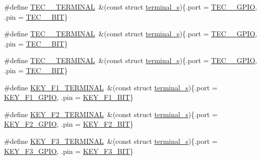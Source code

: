 \begin{DoxyCompactItemize}
\item 
\#define \hyperlink{group__hal_gaf57c15d1a0c66122305352e3637026c2}{T\+E\+C\+\_\+\_\+\+T\+E\+R\+M\+I\+N\+AL}~\&(const struct \hyperlink{structterminal__s}{terminal\+\_\+s})\{.port = \hyperlink{group__samples_ga83ce1f0ab51ee7b4df55e629cdfc52d9}{T\+E\+C\+\_\+\_\+\+G\+P\+IO}, .pin = \hyperlink{group__samples_gaed7549a304721e36693036c8a289ff4c}{T\+E\+C\+\_\+\_\+\+B\+IT}\}
\item 
\#define \hyperlink{group__hal_ga9f8f74ae7816a025d02645ae892d1126}{T\+E\+C\+\_\+\_\+\+T\+E\+R\+M\+I\+N\+AL}~\&(const struct \hyperlink{structterminal__s}{terminal\+\_\+s})\{.port = \hyperlink{group__samples_gae8728c8f2e4279383925ff93a183b407}{T\+E\+C\+\_\+\_\+\+G\+P\+IO}, .pin = \hyperlink{group__samples_ga64392cf03fba776f8a9dc238e25ec184}{T\+E\+C\+\_\+\_\+\+B\+IT}\}
\item 
\#define \hyperlink{group__hal_gabc104deb091e5ee6be6445dbd2c5d1ae}{T\+E\+C\+\_\+\_\+\+T\+E\+R\+M\+I\+N\+AL}~\&(const struct \hyperlink{structterminal__s}{terminal\+\_\+s})\{.port = \hyperlink{group__samples_gaa5418f15596d7ada110c4105aa70e561}{T\+E\+C\+\_\+\_\+\+G\+P\+IO}, .pin = \hyperlink{group__samples_gac7c8a49f0602d0aeee33923ce8708a4b}{T\+E\+C\+\_\+\_\+\+B\+IT}\}
\item 
\#define \hyperlink{group__hal_ga5626e4124830d632401a45cef41ab012}{K\+E\+Y\+\_\+\+F1\+\_\+\+T\+E\+R\+M\+I\+N\+AL}~\&(const struct \hyperlink{structterminal__s}{terminal\+\_\+s})\{.port = \hyperlink{group__hal_ga5ca4d37214720b82e845407c6fa2347a}{K\+E\+Y\+\_\+\+F1\+\_\+\+G\+P\+IO}, .pin = \hyperlink{group__hal_gaa5e208d84a752a40a307c23236dc60e2}{K\+E\+Y\+\_\+\+F1\+\_\+\+B\+IT}\}
\item 
\#define \hyperlink{group__hal_ga7ff86388200bb3989273fc3b0dc138b2}{K\+E\+Y\+\_\+\+F2\+\_\+\+T\+E\+R\+M\+I\+N\+AL}~\&(const struct \hyperlink{structterminal__s}{terminal\+\_\+s})\{.port = \hyperlink{group__hal_ga84995a20a536edfbc062b220c761768e}{K\+E\+Y\+\_\+\+F2\+\_\+\+G\+P\+IO}, .pin = \hyperlink{group__hal_gaa1529bc5c7a8cc9c0221078f2425eed8}{K\+E\+Y\+\_\+\+F2\+\_\+\+B\+IT}\}
\item 
\#define \hyperlink{group__hal_ga407d2cd21ce7ba2bca291fa83db88c6e}{K\+E\+Y\+\_\+\+F3\+\_\+\+T\+E\+R\+M\+I\+N\+AL}~\&(const struct \hyperlink{structterminal__s}{terminal\+\_\+s})\{.port = \hyperlink{group__hal_gac7de7a3e791e70cb61e1ba74c23fd8f3}{K\+E\+Y\+\_\+\+F3\+\_\+\+G\+P\+IO}, .pin = \hyperlink{group__hal_ga0b750ff71397168903bb9406b4a0bc43}{K\+E\+Y\+\_\+\+F3\+\_\+\+B\+IT}\}
\item 

\end{DoxyCompactItemize}

